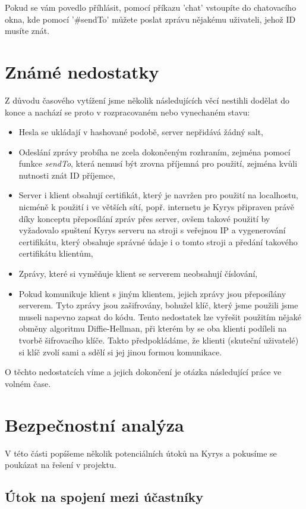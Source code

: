 \documentclass[a4paper]{article}
\begin{document}
Pokud se vám povedlo příhlásit, pomocí příkazu 'chat' vstoupíte do chatovacího okna, kde pomocí '\#sendTo' můžete poslat zprávu nějakému uživateli, jehož ID musíte znát.

\section{Známé nedostatky}
\label{sec:unfinished}
Z důvodu časového vytížení jsme několik následujících věcí nestihli dodělat do konce a nachází se proto v rozpracovaném nebo vynechaném stavu:
\begin{itemize}
\item Hesla se ukládají v hashované podobě, server nepřidává žádný salt,
\item Odeslání zprávy probíha ne zcela dokončeným rozhraním, zejména pomocí funkce \textit{sendTo}, která nemusí být zrovna příjemná pro použití, zejména kvůli nutnosti znát ID příjemce,
\item Server i klient obsahují certifikát, který je navržen pro použití na localhostu, nicméně k použití i ve větších sítí, popř. internetu je Kyrys připraven právě díky konceptu přeposílání zpráv přes server, ovšem takové použití by vyžadovalo spuštení Kyrys serveru na stroji s veřejnou IP a vygenerování certifikátu, který obsahuje správné údaje i o tomto stroji a předání takového certifikátu klientům,
\item Zprávy, které si vyměňuje klient se serverem neobsahují číslování,
\item Pokud komunikuje klient s jiným klientem, jejich zprávy jsou přeposílány serverem. Tyto zprávy jsou zašifrovány, bohužel klíč, který jsme použili jsme museli napevno zapsat do kódu. Tento nedostatek lze vyřešit použitím nějaké obměny algoritmu Diffie-Hellman, při kterém by se oba klienti podíleli na tvorbě šifrovacího klíče. Takto předpokládáme, že klienti (skuteční uživatelé) si klíč zvolí sami a sdělí si jej jinou formou komunikace.
\end{itemize}

O těchto nedostatcích víme a jejich dokončení je otázka následující práce ve volném čase.

\section{Bezpečnostní analýza}
V této části popíšeme několik potenciálních útoků na Kyrys a pokusíme se poukázat na řešení v projektu.

\subsection{Útok na spojení mezi účastníky}
\end{document}
